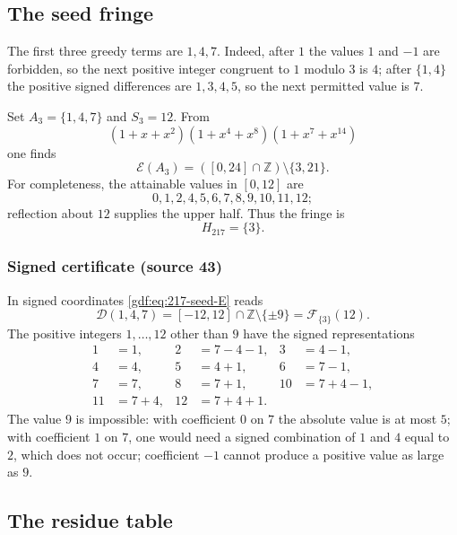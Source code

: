 \documentclass[11pt,a4paper]{article}
\numberwithin{equation}{section}
\theoremstyle{definition}
\theoremstyle{remark}
\theoremstyle{plain}
\newcommand{\Z}{\mathbb Z}
\newcommand{\cD}{\mathcal D}
\newcommand{\cE}{\mathcal E}
\newcommand{\cF}{\mathcal F}
\newcommand{\src}[1]{\textup{(source #1)}}
\begin{document}
\subsection{The seed fringe}

The first three greedy terms are $1,4,7$.  Indeed, after $1$ the values
$1$ and $-1$ are forbidden, so the next positive integer congruent to $1$
modulo $3$ is $4$; after $\{1,4\}$ the positive signed differences are
$1,3,4,5$, so the next permitted value is $7$.

Set $A_3=\{1,4,7\}$ and $S_3=12$.  From
\[
 (1+x+x^2)(1+x^4+x^8)(1+x^7+x^{14})
\]
one finds
\begin{equation}\label{gdf:eq:217-seed-E}
 \cE(A_3)=([0,24]\cap\Z)\setminus\{3,21\}.
\end{equation}
For completeness, the attainable values in $[0,12]$ are
\[
 0,1,2,4,5,6,7,8,9,10,11,12;
\]
reflection about $12$ supplies the upper half.  Thus the fringe is
\begin{equation}\label{gdf:eq:H217}
 H_{217}=\{3\}.
\end{equation}

\subsubsection*{Signed certificate \src{43}}

In signed coordinates \eqref{gdf:eq:217-seed-E} reads
\begin{equation}\label{gdf:eq:u-base}
 \cD(1,4,7)=[-12,12]\cap\Z\setminus\{\pm9\}=\cF_{\{3\}}(12).
\end{equation}
The positive integers $1,\dots,12$ other than $9$ have the signed
representations
\[
\begin{aligned}
 1&=1,        &2&=7-4-1, &3&=4-1,\\
 4&=4,        &5&=4+1,   &6&=7-1,\\
 7&=7,        &8&=7+1,   &10&=7+4-1,\\
 11&=7+4,     &12&=7+4+1.&&
\end{aligned}
\]
The value $9$ is impossible: with coefficient $0$ on $7$ the absolute value is
at most $5$; with coefficient $1$ on $7$, one would need a signed combination
of $1$ and $4$ equal to $2$, which does not occur; coefficient $-1$ cannot
produce a positive value as large as $9$.

\subsection{The residue table}
\end{document}
